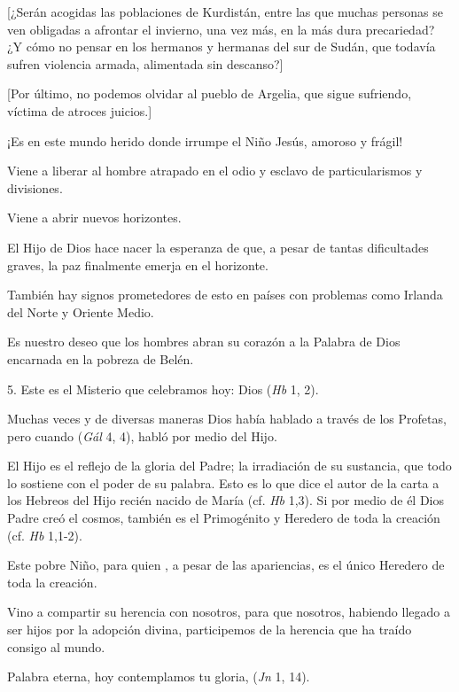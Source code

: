 \begin{body}
\begin{body}
		{[}¿Serán acogidas las poblaciones de Kurdistán, entre las que muchas personas se ven obligadas a afrontar el invierno, una vez más, en la más dura precariedad? ¿Y cómo no pensar en los hermanos y hermanas del sur de Sudán, que todavía sufren violencia armada, alimentada sin descanso?{]}
		
		{[}Por último, no podemos olvidar al pueblo de Argelia, que sigue sufriendo, víctima de atroces juicios.{]}
		
		¡Es en este mundo herido donde irrumpe el Niño Jesús, amoroso y frágil!
		
		Viene a liberar al hombre atrapado en el odio y esclavo de particularismos y divisiones.
		
		Viene a abrir nuevos horizontes.
		
		El Hijo de Dios hace nacer la esperanza de que, a pesar de tantas dificultades graves, la paz finalmente emerja en el horizonte.
		
		También hay signos prometedores de esto en países con problemas como Irlanda del Norte y Oriente Medio.
		
		Es nuestro deseo que los hombres abran su corazón a la Palabra de Dios encarnada en la pobreza de Belén.
		
		5. Este es el Misterio que celebramos hoy: Dios  (\emph{Hb} 1, 2).
		
		Muchas veces y de diversas maneras Dios había hablado a través de los Profetas, pero cuando  (\emph{Gál} 4, 4), habló por medio del Hijo.
		
		El Hijo es el reflejo de la gloria del Padre; la irradiación de su sustancia, que todo lo sostiene con el poder de su palabra. Esto es lo que dice el autor de la carta a los Hebreos del Hijo recién nacido de María (cf. \emph{Hb} 1,3). Si por medio de él Dios Padre creó el cosmos, también es el Primogénito y Heredero de toda la creación (cf. \emph{Hb} 1,1-2).
		
		Este pobre Niño, para quien , a pesar de las apariencias, es el único Heredero de toda la creación.
		
		Vino a compartir su herencia con nosotros, para que nosotros, habiendo llegado a ser hijos por la adopción divina, participemos de la herencia que ha traído consigo al mundo.
		
		Palabra eterna, hoy contemplamos tu gloria,  (\emph{Jn} 1, 14).
		

\end{body}
\end{body}
